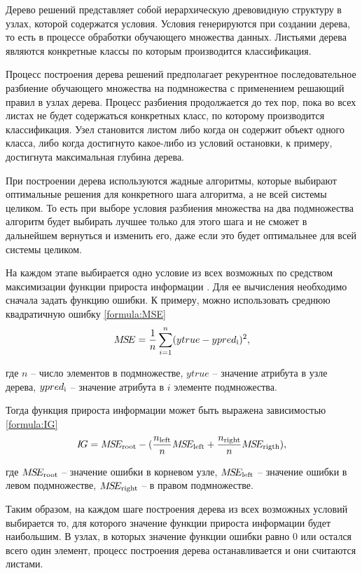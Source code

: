 Дерево решений представляет собой иерархическую древовидную структуру в узлах, которой содержатся условия. Условия генерируются при создании дерева, то есть в процессе обработки обучающего множества данных. Листьями дерева являются конкретные классы по которым производится классификация.

Процесс построения дерева решений предполагает рекурентное последовательное разбиение обучающего множества на подмножества с применением решающий правил в узлах дерева. Процесс разбиения продолжается до тех пор, пока во всех листах не будет содержаться конкретных класс, по которому производится классификация. Узел становится листом либо когда он содержит объект одного класса, либо когда достигнуто какое-либо из условий остановки, к примеру, достигнута максимальная глубина дерева.

При построении дерева используются жадные алгоритмы, которые выбирают оптимальные решения для конкретного шага алгоритма, а не всей системы целиком. То есть при выборе условия разбиения множества на два подмножества алгоритм будет выбирать лучшее только для этого шага и не сможет в дальнейшем вернуться и изменить его, даже если это будет оптимальнее для всей системы целиком.

На каждом этапе выбирается одно условие из всех возможных по средством максимизации функции прироста информации \cite{solve_tree}. Для ее вычисления необходимо сначала задать функцию ошибки. К примеру, можно использовать среднюю квадратичную ошибку \ref{formula:MSE}
\begin{equation}\label{formula:MSE}
M\!S\!E = \frac{1}{n}\sum\limits_{i = 1}^{n}(ytrue - ypred_{\rm{i}})^2,
\end{equation} 

где $n$ -- число элементов в подмножестве, $ytrue$ -- значение атрибута в узле дерева, $ypred_{\rm{i}}$ -- значение атрибута в $i$ элементе подмножества.

Тогда функция прироста информации может быть выражена зависимостью \ref{formula:IG}
\begin{equation}\label{formula:IG}
I\!G = M\!S\!E_{\rm{root}} - (\frac{n_{\rm{left}}}{n}M\!S\!E_{\rm{left}} + \frac{n_{\rm{right}}}{n}M\!S\!E_{\rm{rigth}}),
\end{equation} 

где $M\!S\!E_{\rm{root}}$ -- значение ошибки в корневом узле, $M\!S\!E_{\rm{left}}$ -- значение ошибки в левом подмножестве, $M\!S\!E_{\rm{right}}$ -- в правом подмножестве.

Таким образом, на каждом шаге построения дерева из всех возможных условий выбирается то, для которого значение функции прироста информации будет наибольшим. В узлах, в которых значение функции ошибки равно 0 или остался всего один элемент, процесс построения дерева останавливается и они считаются листами.

